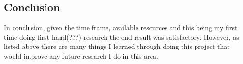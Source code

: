\documentclass[journal]{IEEEtran}
\begin{document}
	
	\subsection{Conclusion}
	In conclusion, given the time frame, available resources and this being my first time doing first hand(???) research the end result was satisfactory. However, as listed above there are many things I learned through doing this project that would improve any future research I do in this area.
\end{document}

